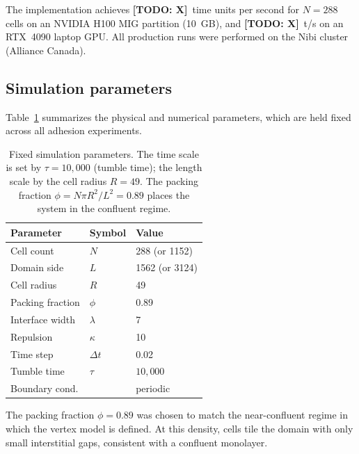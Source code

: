 \documentclass[aps,pre,twocolumn,superscriptaddress,longbibliography]{revtex4-2}
\newcommand{\todo}[1]{{\color{red}\textbf{[TODO: #1]}}}
\begin{document}
The implementation achieves \todo{X}~time units per second for $N = 288$ cells
on an NVIDIA H100 MIG partition (10~GB), and \todo{X}~t/s on an RTX~4090
laptop GPU.  All production runs were performed on the Nibi cluster
(Alliance Canada).

\subsection{Simulation parameters}
\label{sec:methods:params}

Table~\ref{tab:params} summarizes the physical and numerical parameters, which
are held fixed across all adhesion experiments.

\begin{table}[b]
  \caption{%
    Fixed simulation parameters.  The time scale is set by $\tau = 10{,}000$
    (tumble time); the length scale by the cell radius $R = 49$.  The packing
    fraction $\phi = N \pi R^2 / L^2 = 0.89$ places the system in the
    confluent regime.
  }
  \label{tab:params}
  \begin{ruledtabular}
  \begin{tabular}{lll}
    Parameter & Symbol & Value \\ \hline
    Cell count       & $N$        & 288 (or 1152)     \\
    Domain side      & $L$        & 1562 (or 3124)    \\
    Cell radius      & $R$        & 49                \\
    Packing fraction & $\phi$     & 0.89              \\
    Interface width  & $\lambda$  & 7                 \\
    Repulsion        & $\kappa$   & 10                \\
    Time step        & $\Delta t$ & 0.02              \\
    Tumble time      & $\tau$     & $10{,}000$        \\
    Boundary cond.   &            & periodic          \\
  \end{tabular}
  \end{ruledtabular}
\end{table}

The packing fraction $\phi = 0.89$ was chosen to match the near-confluent
regime in which the vertex model is defined.  At this density, cells tile
the domain with only small interstitial gaps, consistent with a confluent
monolayer.
\end{document}
